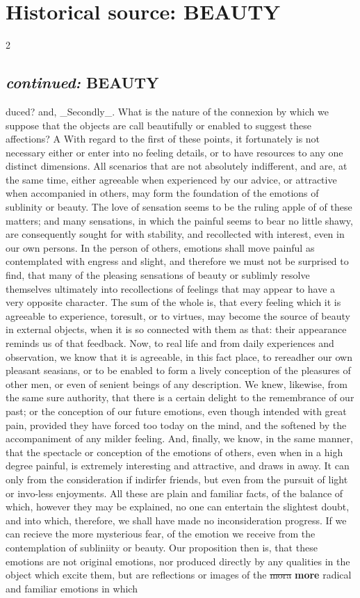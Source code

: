 \documentclass[10pt]{article}
\begin{document}
\section*{Historical source: BEAUTY}
\begin{multicols}{2}
\subsection*{\textit{continued:} BEAUTY}
duced? and, \_Secondly\_. What is the nature of the connexion by which we suppose that the objects are call beautifully or enabled to suggest these affections? A With regard to the first of these points, it fortunately is not necessary either or enter into no feeling details, or to have resources to any one distinct dimensions. All scenarios that are not absolutely indifferent, and are, at the same time, either agreeable when experienced by our advice, or attractive when accompanied in others, may form the foundation of the emotions of sublinity or beauty. The love of sensation seems to be the ruling apple of of these matters; and many sensations, in which the painful seems to bear no little shawy, are consequently sought for with stability, and recollected with interest, even in our own persons. In the person of others, emotions shall move painful as contemplated with engress and slight, and therefore we must not be surprised to find, that many of the pleasing sensations of beauty or sublimly resolve themselves ultimately into recollections of feelings that may appear to have a very opposite character. The sum of the whole is, that every feeling which it is agreeable to experience, toresult, or to virtues, may become the source of beauty in external objects, when it is so connected with them as that: their appearance reminds us of that feedback. Now, to real life and from daily experiences and observation, we know that it is agreeable, in this fact place, to rereadher our own pleasant seasians, or to be enabled to form a lively conception of the pleasures of other men, or even of senient beings of any description. We knew, likewise, from the same sure authority, that there is a certain delight to the remembrance of our past; or the conception of our future emotions, even though intended with great pain, provided they have forced too today on the mind, and the softened by the accompaniment of any milder feeling. And, finally, we know, in the same manner, that the spectacle or conception of the emotions of others, even when in a high degree painful, is extremely interesting and attractive, and draws in away. It can only from the consideration if indirfer friends, but even from the pursuit of light or invo-less enjoyments. All these are plain and familiar facts, of the balance of which, however they may be explained, no one can entertain the slightest doubt, and into which, therefore, we shall have made no inconsideration progress. If we can recieve the more mysterious fear, of the emotion we receive from the contemplation of subliniity or beauty. Our proposition then is, that these emotions are not original emotions, nor produced directly by any qualities in the object which excite them, but are reflections or images of the \sout{mora} \textbf{more} radical and familiar emotions in which 
\end{multicols}
\end{document}
